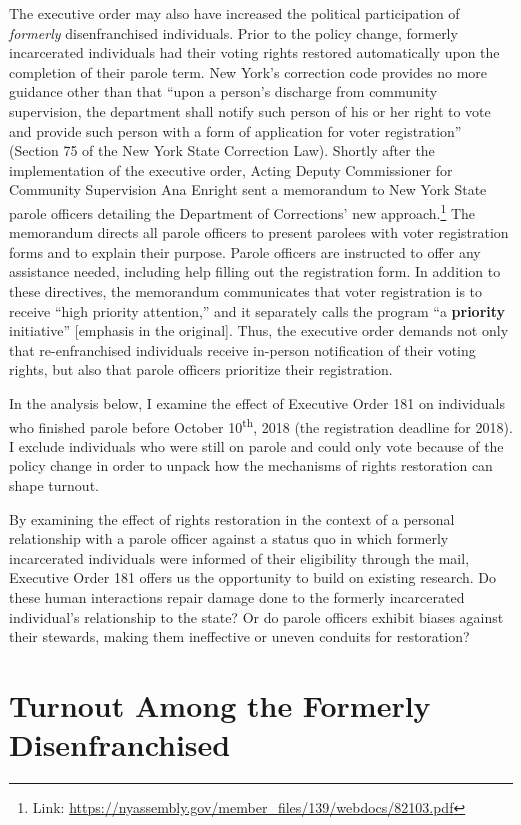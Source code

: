 \documentclass[
  12pt,
]{article}
\begin{document}
The executive order may also have increased the political participation of \emph{formerly} disenfranchised individuals. Prior to the policy change, formerly incarcerated individuals had their voting rights restored automatically upon the completion of their parole term. New York's correction code provides no more guidance other than that ``upon a person's discharge from community supervision, the department shall notify such person of his or her right to vote and provide such person with a form of application for voter registration'' (Section 75 of the New York State Correction Law). Shortly after the implementation of the executive order, Acting Deputy Commissioner for Community Supervision Ana Enright sent a memorandum to New York State parole officers detailing the Department of Corrections' new approach.\footnote{Link: \url{https://nyassembly.gov/member_files/139/webdocs/82103.pdf}} The memorandum directs all parole officers to present parolees with voter registration forms and to explain their purpose. Parole officers are instructed to offer any assistance needed, including help filling out the registration form. In addition to these directives, the memorandum communicates that voter registration is to receive ``high priority attention,'' and it separately calls the program ``a \textbf{priority} initiative'' {[}emphasis in the original{]}. Thus, the executive order demands not only that re-enfranchised individuals receive in-person notification of their voting rights, but also that parole officers prioritize their registration.

In the analysis below, I examine the effect of Executive Order 181 on individuals who finished parole before October 10\textsuperscript{th}, 2018 (the registration deadline for 2018). I exclude individuals who were still on parole and could only vote because of the policy change in order to unpack how the mechanisms of rights restoration can shape turnout.

By examining the effect of rights restoration in the context of a personal relationship with a parole officer against a status quo in which formerly incarcerated individuals were informed of their eligibility through the mail, Executive Order 181 offers us the opportunity to build on existing research. Do these human interactions repair damage done to the formerly incarcerated individual's relationship to the state? Or do parole officers exhibit biases against their stewards, making them ineffective or uneven conduits for restoration?

\hypertarget{turnout-among-the-formerly-disenfranchised}{%
\section*{Turnout Among the Formerly Disenfranchised}\label{turnout-among-the-formerly-disenfranchised}}
\end{document}
